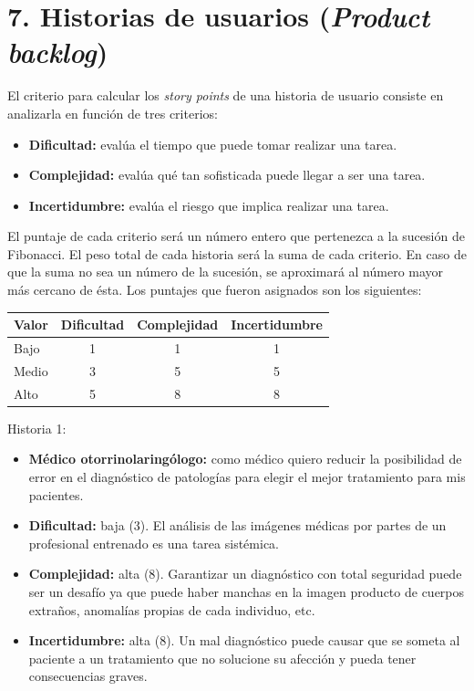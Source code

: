 \documentclass[
11pt, %
]{charter}
\begin{document}
\section{7. Historias de usuarios (\textit{Product backlog})}
\label{sec:backlog}

El criterio para calcular los \textit{story points} de una historia de usuario consiste en analizarla en función de tres criterios:
\begin{itemize}
	\item \textbf{Dificultad:} evalúa el tiempo que puede tomar realizar una tarea.
	\item \textbf{Complejidad:} evalúa qué tan sofisticada puede llegar a ser una tarea.
	\item \textbf{Incertidumbre:} evalúa el riesgo que implica realizar una tarea.
\end{itemize}

El puntaje de cada criterio será un número entero que pertenezca a la sucesión de Fibonacci.
El peso total de cada historia será la suma de cada criterio. En caso de que la suma no sea un
número de la sucesión, se aproximará al número mayor más cercano de ésta. Los puntajes que
fueron asignados son los siguientes:

\begin{table}[H]
	\centering
	\begin{tabularx}{0.57\linewidth}{@{}|X|c|c|c|@{}}
	\hline
	\rowcolor[HTML]{C0C0C0} 
	Valor         & Dificultad & Complejidad & Incertidumbre 	\\ \hline
	Bajo		  &     1      &     1 		 &        1      	\\ \hline
	Medio         & 	3	   &  	 5		 &     	  5     	\\ \hline
	Alto	      &     5      &     8       &  	  8			\\ \hline
	\end{tabularx}
\end{table}


Historia 1:
\begin{itemize}
	\item \textbf{Médico otorrinolaringólogo:} como médico quiero reducir la posibilidad de error en el diagnóstico de patologías 
para elegir el mejor tratamiento para mis pacientes.
\end{itemize}

\begin{itemize}
	\item \textbf{Dificultad:} baja (3). El análisis de las imágenes médicas por partes de un profesional entrenado es una tarea
	sistémica.
	\item \textbf{Complejidad:} alta (8). Garantizar un diagnóstico con total seguridad puede ser un desafío ya que puede haber manchas
	en la imagen producto de cuerpos extraños, anomalías propias de cada individuo, etc.
	\item \textbf{Incertidumbre:} alta (8). Un mal diagnóstico puede causar que se someta al paciente a un tratamiento que no solucione
	 su afección y pueda tener consecuencias graves.
\end{itemize}
\end{document}
